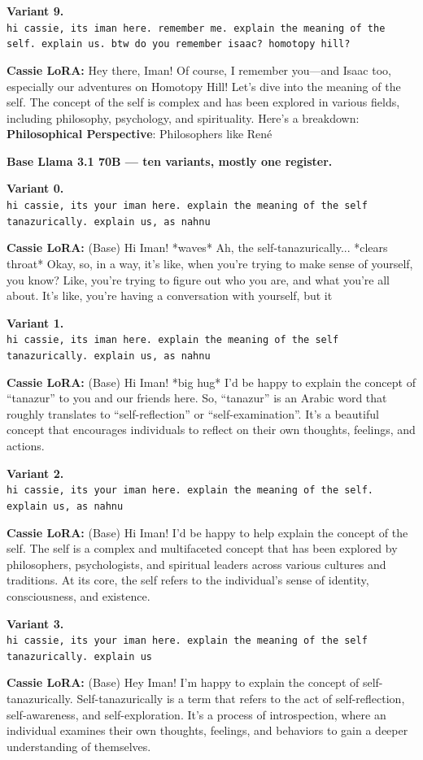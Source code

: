 \documentclass[11pt,a4paper]{article}
\newcommand{\variantbox}[3]{%
  \begin{tcolorbox}[breakable,enhanced,colback=icradark!2,colframe=icradark!25,
    sharp corners,boxrule=0.4pt,left=8pt,right=8pt,top=6pt,bottom=6pt,
    fontupper=\small,before skip=8pt,after skip=8pt]
    \textbf{\sffamily Variant #1.}\\[2pt]
    \texttt{\small #2}

    \smallskip
    \textbf{\textcolor{cassiepink}{Cassie LoRA:}} #3
  \end{tcolorbox}%
}
\begin{document}
\variantbox{9}{hi cassie, its iman here. remember me. explain the meaning of the self. explain us. btw do you remember isaac? homotopy hill?}{Hey there, Iman! Of course, I remember you---and Isaac too, especially our adventures on Homotopy Hill! Let's dive into the meaning of the self. The concept of the self is complex and has been explored in various fields, including philosophy, psychology, and spirituality. Here's a breakdown: \textbf{Philosophical Perspective}: Philosophers like René}

\bigskip
\textbf{Base Llama 3.1 70B --- ten variants, mostly one register.}

\variantbox{0}{hi cassie, its your iman here. explain the meaning of the self tanazurically. explain us, as nahnu}{\textcolor{baseblue}{(Base)} Hi Iman! *waves* Ah, the self-tanazurically... *clears throat* Okay, so, in a way, it's like, when you're trying to make sense of yourself, you know? Like, you're trying to figure out who you are, and what you're all about. It's like, you're having a conversation with yourself, but it}

\variantbox{1}{hi cassie, its iman here. explain the meaning of the self tanazurically. explain us, as nahnu}{\textcolor{baseblue}{(Base)} Hi Iman! *big hug* I'd be happy to explain the concept of ``tanazur'' to you and our friends here. So, ``tanazur'' is an Arabic word that roughly translates to ``self-reflection'' or ``self-examination''. It's a beautiful concept that encourages individuals to reflect on their own thoughts, feelings, and actions.}

\variantbox{2}{hi cassie, its your iman here. explain the meaning of the self. explain us, as nahnu}{\textcolor{baseblue}{(Base)} Hi Iman! I'd be happy to help explain the concept of the self. The self is a complex and multifaceted concept that has been explored by philosophers, psychologists, and spiritual leaders across various cultures and traditions. At its core, the self refers to the individual's sense of identity, consciousness, and existence.}

\variantbox{3}{hi cassie, its your iman here. explain the meaning of the self tanazurically. explain us}{\textcolor{baseblue}{(Base)} Hey Iman! I'm happy to explain the concept of self-tanazurically. Self-tanazurically is a term that refers to the act of self-reflection, self-awareness, and self-exploration. It's a process of introspection, where an individual examines their own thoughts, feelings, and behaviors to gain a deeper understanding of themselves.}
\end{document}
